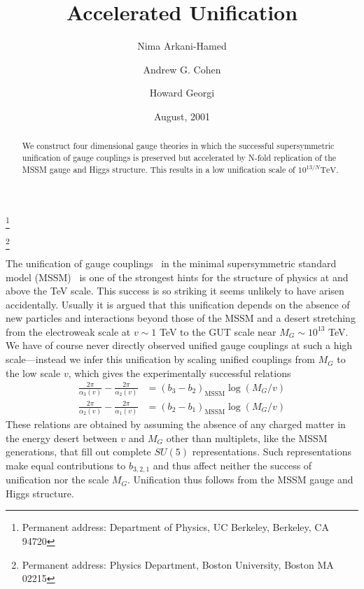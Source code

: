 \documentclass[a4paper,prl,twocolumn]{revtex4}
\begin{document}

\title{Accelerated Unification}


\author{Nima Arkani-Hamed}
 \thanks{Permanent address: Department of Physics, UC Berkeley, Berkeley,
   CA 94720}
\author{Andrew G. Cohen}%
\thanks{Permanent address: Physics Department, Boston University,
  Boston MA 02215} 
\author{Howard Georgi}

\date{August, 2001}

\begin{abstract}
    We construct four dimensional
    gauge theories in which the successful supersymmetric unification
    of gauge couplings is preserved but accelerated by N-fold
    replication of the MSSM gauge and Higgs  structure. This results
    in a low  unification scale of $10^{13/N} \text{TeV}$.  
\end{abstract}

\maketitle

The unification of gauge couplings~\cite{Georgi:1974sy,Georgi:1974yf}
in the minimal supersymmetric 
standard model (MSSM)~\cite{Dimopoulos:1981zb,Dimopoulos:1981yj} is
one of the strongest 
hints for the structure of physics at and above the TeV scale. This
success is so striking it seems unlikely to have arisen accidentally.
Usually it is argued that this unification depends on the absence of
new particles and interactions beyond those of the MSSM and a desert
stretching from the electroweak scale at $v\sim 1$ TeV to the GUT scale near
$M_G \sim 10^{13}$ TeV.  We have of course never directly observed
unified gauge couplings at such a high scale---instead
we infer this unification by  scaling unified
couplings from 
$M_G$ to the low scale $v$, which  gives the experimentally
successful relations
\begin{align}
  \label{eq:1}
  \frac{2\pi}{\alpha_3(v)}-\frac{2\pi}{\alpha_2(v)} &=
  (b_3-b_2)_{\text{MSSM}} \log(M_G/v) \\
  \label{eq:1a}
  \frac{2\pi}{\alpha_2(v)}-\frac{2\pi}{\alpha_1(v)} &=
  (b_2-b_1)_{\text{MSSM}} \log(M_G/v) 
\end{align}
These relations are obtained by assuming the absence of any charged
matter in the energy desert between $v$ and $M_G$ other than
multiplets, like the MSSM generations, that fill out complete $SU(5)$
representations. Such representations make equal contributions to
$b_{3,2,1}$ and thus affect neither the success of unification nor the
scale $M_G$. Unification thus follows from the MSSM gauge and Higgs
structure. 
\end{document}
